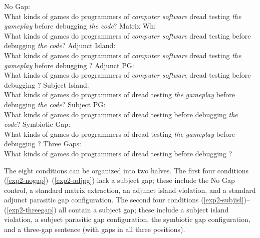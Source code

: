 \documentclass[12pt]{article}
\begin{document}
\pex\label{exp2-conditions}
\a\label{exp2-nogap} No Gap:\\
What kinds of games do programmers of \emph{computer software} dread testing \emph{the gameplay} before debugging \emph{the code}?
\a\label{exp2-matwh} Matrix Wh:\\
What kinds of games do programmers of \emph{computer software} dread testing \underline{\hspace{1em}} before debugging \emph{the code}?
\a\label{exp2-adjisl} Adjunct Island:\\
What kinds of games do programmers of \emph{computer software} dread testing \emph{the gameplay} before debugging \underline{\hspace{1em}}?
\a\label{exp2-adjpg} Adjunct PG:\\
What kinds of games do programmers of \emph{computer software} dread testing \underline{\hspace{1em}} before debugging \underline{\hspace{1em}}?
\a\label{exp2-subjisl} Subject Island:\\
What kinds of games do programmers of \underline{\hspace{1em}} dread testing \emph{the gameplay} before debugging \emph{the code}?
\a\label{exp2-subjpg} Subject PG:\\
What kinds of games do programmers of \underline{\hspace{1em}} dread testing \underline{\hspace{1em}} before debugging \emph{the code}?
\a\label{exp2-symgap} Symbiotic Gap:\\
What kinds of games do programmers of \underline{\hspace{1em}} dread testing \emph{the gameplay} before debugging \underline{\hspace{1em}}?
\a\label{exp2-threegap} Three Gaps:\\
What kinds of games do programmers of \underline{\hspace{1em}} dread testing \underline{\hspace{1em}} before debugging \underline{\hspace{1em}}?
\xe

\noindent The eight conditions can be organized into two halves. The first four conditions (\ref{exp2-nogap})--(\ref{exp2-adjpg}) lack a subject gap; these include the No Gap control, a standard matrix extraction, an adjunct island violation, and a standard adjunct parasitic gap configuration. The second four conditions (\ref{exp2-subjisl})--(\ref{exp2-threegap}) all contain a subject gap; these include a subject island violation, a subject parasitic gap configuration, the symbiotic gap configuration, and a three-gap sentence (with gaps in all three positions).
\end{document}
